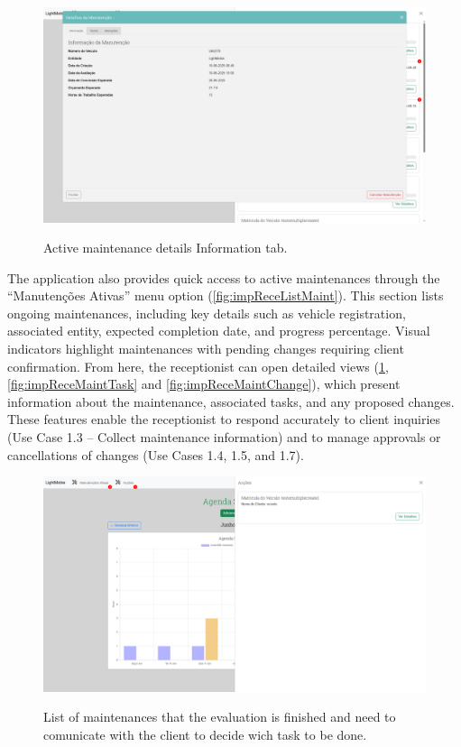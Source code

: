 \begin{figure}[h]
  \caption{Active maintenance details Information tab.}
  \centering
  \includegraphics[width=\textwidth]{figs/Implementation/rececionist/maintenance_details}
  \label{fig:impReceMaintHome}
\end{figure}



The application also provides quick access to active maintenances through the “Manutenções Ativas” menu option (\ref{fig:impReceListMaint}). This section lists ongoing maintenances, including key details such as vehicle registration, associated entity, expected completion date, and progress percentage. Visual indicators highlight maintenances with pending changes requiring client confirmation. From here, the receptionist can open detailed views (\ref{fig:impReceMaintHome}, \ref{fig:impReceMaintTask} and \ref{fig:impReceMaintChange}), which present information about the maintenance, associated tasks, and any proposed changes. These features enable the receptionist to respond accurately to client inquiries (Use Case 1.3 – Collect maintenance information) and to manage approvals or cancellations of changes (Use Cases 1.4, 1.5, and 1.7).


\begin{figure}[h]
  \caption{List of maintenances that the evaluation is finished and need to comunicate with the client to decide wich task to be done.}
  \centering
  \includegraphics[width=\textwidth]{figs/Implementation/rececionist/action_list}
  \label{fig:impReceListAction}
\end{figure}

